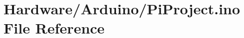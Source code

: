 \hypertarget{_pi_project_8ino}{}\section{Hardware/\+Arduino/\+Pi\+Project.ino File Reference}
\label{_pi_project_8ino}

